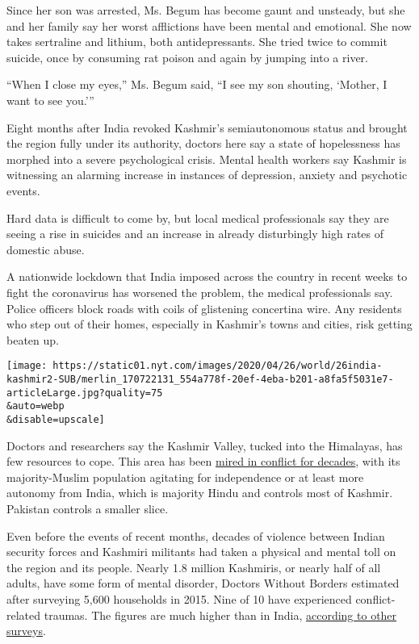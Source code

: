 Since her son was arrested, Ms. Begum has become gaunt and unsteady, but
she and her family say her worst afflictions have been mental and
emotional. She now takes sertraline and lithium, both antidepressants.
She tried twice to commit suicide, once by consuming rat poison and
again by jumping into a river.

``When I close my eyes,'' Ms. Begum said, ``I see my son shouting,
`Mother, I want to see you.'''

Eight months after India revoked Kashmir's semiautonomous status and
brought the region fully under its authority, doctors here say a state
of hopelessness has morphed into a severe psychological crisis. Mental
health workers say Kashmir is witnessing an alarming increase in
instances of depression, anxiety and psychotic events.

Hard data is difficult to come by, but local medical professionals say
they are seeing a rise in suicides and an increase in already
disturbingly high rates of domestic abuse.

A nationwide lockdown that India imposed across the country in recent
weeks to fight the coronavirus has worsened the problem, the medical
professionals say. Police officers block roads with coils of glistening
concertina wire. Any residents who step out of their homes, especially
in Kashmir's towns and cities, risk getting beaten up.

\texttt{[image: https://static01.nyt.com/images/2020/04/26/world/26india-kashmir2-SUB/merlin\_170722131\_554a778f-20ef-4eba-b201-a8fa5f5031e7-articleLarge.jpg?quality=75\\\&auto=webp\\\&disable=upscale]}

Doctors and researchers say the Kashmir Valley, tucked into the
Himalayas, has few resources to cope. This area has been
\href{https://www.nytimes.com/2018/08/01/world/asia/kashmir-war-india-pakistan.html}{mired
in conflict for decades}, with its majority-Muslim population agitating
for independence or at least more autonomy from India, which is majority
Hindu and controls most of Kashmir. Pakistan controls a smaller slice.

Even before the events of recent months, decades of violence between
Indian security forces and Kashmiri militants had taken a physical and
mental toll on the region and its people. Nearly 1.8 million Kashmiris,
or nearly half of all adults, have some form of mental disorder, Doctors
Without Borders estimated after surveying 5,600 households in 2015. Nine
of 10 have experienced conflict-related traumas. The figures are much
higher than in India,
\href{https://www.thelancet.com/journals/lanpsy/article/PIIS2215-0366(19)30475-4/fulltext}{according
to other surveys}.

